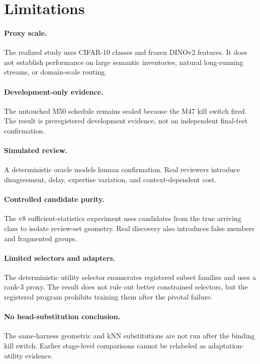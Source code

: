 \documentclass[10pt]{article}
\begin{document}
\section{Limitations}

\paragraph{Proxy scale.}
The realized study uses CIFAR-10 classes and frozen DINOv2 features. It does
not establish performance on large semantic inventories, natural long-running
streams, or domain-scale routing.

\paragraph{Development-only evidence.}
The untouched M50 schedule remains sealed because the M47 kill switch fired.
The result is preregistered development evidence, not an independent final-test
confirmation.

\paragraph{Simulated review.}
A deterministic oracle models human confirmation. Real reviewers introduce
disagreement, delay, expertise variation, and context-dependent cost.

\paragraph{Controlled candidate purity.}
The v8 sufficient-statistics experiment uses candidates from the true arriving
class to isolate review-set geometry. Real discovery also introduces false
members and fragmented groups.

\paragraph{Limited selectors and adapters.}
The deterministic utility selector enumerates registered subset families and
uses a rank-3 proxy. The result does not rule out better constrained selectors,
but the registered program prohibits training them after the pivotal failure.

\paragraph{No head-substitution conclusion.}
The same-harness geometric and kNN substitutions are not run after the binding
kill switch. Earlier stage-level comparisons cannot be relabeled as
adaptation-utility evidence.
\end{document}
